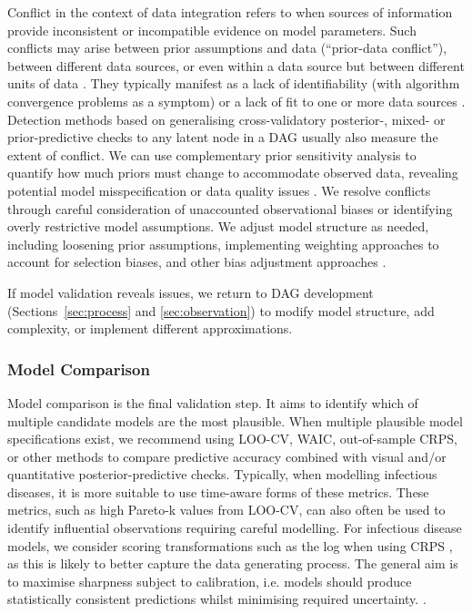 \documentclass{article}
\begin{document}
Conflict in the context of data integration refers to when sources of information provide inconsistent or incompatible evidence on model parameters. Such conflicts may arise between prior assumptions and data (``prior-data conflict''), between different data sources, or even within a data source but between different units of data \citep{presanis2013conflict,yang2025detecting}.
They typically manifest as a lack of identifiability (with algorithm convergence problems as a symptom) or a lack of fit to one or more data sources \citep{presanis2013conflict,deangelis2018analysing}. Detection methods based on generalising cross-validatory posterior-, mixed- or prior-predictive checks to any latent node in a DAG \citep{presanis2013conflict,yang2025detecting} usually also measure the extent of conflict. We can use complementary prior sensitivity analysis to quantify how much priors must change to accommodate observed data, revealing potential model misspecification or data quality issues \citep{Roos2015, Kallioinen2024, yang2025detecting}. We resolve conflicts through careful consideration of unaccounted observational biases or identifying overly restrictive model assumptions. We adjust model structure as needed, including loosening prior assumptions, implementing weighting approaches to account for selection biases, and other bias adjustment approaches \citep{deangelis2018analysing}.

If model validation reveals issues, we return to \ac{DAG} development (Sections~\ref{sec:process} and \ref{sec:observation}) to modify model structure, add complexity, or implement different approximations.

\subsubsection{Model Comparison}

Model comparison is the final validation step. It aims to identify which of multiple candidate models are the most plausible.
When multiple plausible model specifications exist, we recommend using \ac{LOO-CV}, \ac{WAIC}, out-of-sample \ac{CRPS}, or other methods to compare predictive accuracy \citep{yao2018using,gneiting2007strictly} combined with visual and/or quantitative posterior-predictive checks.
Typically, when modelling infectious diseases, it is more suitable to use time-aware forms of these metrics.
These metrics, such as high Pareto-k values from \ac{LOO-CV}, can also often be used to identify influential observations requiring careful modelling.
For infectious disease models, we consider scoring transformations such as the log when using \ac{CRPS} \citep{bosse2023scoring}, as this is likely to better capture the data generating process.
The general aim is to maximise sharpness subject to calibration, i.e. models should produce statistically consistent predictions whilst minimising required uncertainty. \citep{gneiting2007strictly}.
\end{document}
